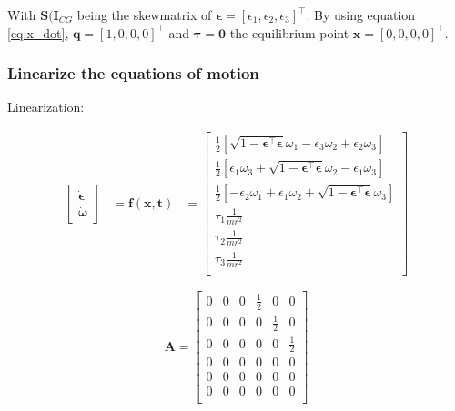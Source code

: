 
With $\mathbf{S} (\mathbf{I}_{CG}$ being the skewmatrix of $\boldsymbol{\epsilon} = [\epsilon_1, \epsilon_2, \epsilon_3]^\top$. By using equation \eqref{eq:x_dot},   $\mathbf{q} = [1, 0, 0, 0]^\top$ and $\boldsymbol{\tau} = \boldsymbol{0}$ the equilibrium point $\mathbf{x} = [0, 0, 0, 0]^\top$.


\subsubsection*{Linearize the equations of motion}

Linearization: 

\begin{equation}
    \begin{aligned}
    \begin{bmatrix}
		\dot{\boldsymbol{\epsilon}} \\
		\dot{\boldsymbol{\omega}}
    \end{bmatrix}
    &=
	\mathbf{f(\mathbf{x},t)} 
	&= 
	\begin{bmatrix}
		\frac{1}{2}[ \sqrt{1-\boldsymbol{\epsilon}^\top \boldsymbol{\epsilon}} \omega_1  - \epsilon_3 \omega_2 + \epsilon_2 \omega_3  ] \\
		\frac{1}{2}[ \epsilon_1 \omega_3 +  \sqrt{1-\boldsymbol{\epsilon}^\top \boldsymbol{\epsilon}} \omega_2  - \epsilon_1 \omega_3 ] \\
		\frac{1}{2}[  - \epsilon_2 \omega_1  + \epsilon_1 \omega_2 + \sqrt{1-\boldsymbol{\epsilon}^\top \boldsymbol{\epsilon}} \omega_3  ] \\
		\tau_1 \frac{1}{mr^2}\\
		\tau_2 \frac{1}{mr^2}\\
		\tau_3 \frac{1}{mr^2}\\
	\end{bmatrix}
	\end{aligned}
\end{equation}


\begin{equation}
	\mathbf{A} = 
	\begin{bmatrix}
		0 & 0 & 0 & \frac{1}{2} & 0   & 0\\
		0 & 0 & 0 & 0   & \frac{1}{2} & 0\\
		0 & 0 & 0 & 0   & 0   & \frac{1}{2}\\
		0 & 0 & 0 & 0 & 0 & 0\\
		0 & 0 & 0 & 0 & 0 & 0\\
		0 & 0 & 0 & 0 & 0 & 0\\
	\end{bmatrix}
\end{equation}

